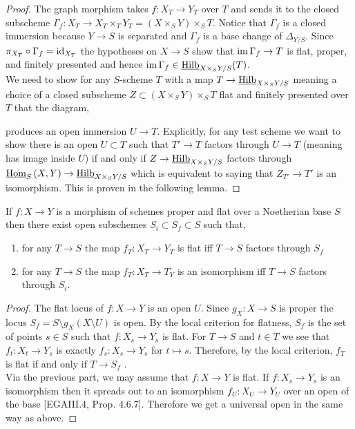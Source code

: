 \documentclass[12pt]{article}
\newcommand{\uHilb}{\underline{\Hilb}}
\newcommand{\uHom}[3]{\underline{\mathrm{Hom}}_{#1}\left(#2, #3\right)}
\begin{document}
\begin{proof}
The graph morphism takes $f : X_T \to Y_T$ over $T$ and sends it to the closed subscheme $\Gamma_f : X_T \to X_T \times_T Y_T = (X \times_S Y) \times_S T$. Notice that $\Gamma_f$ is a closed immersion because $Y \to S$ is separated and $\Gamma_f$ is a base change of $\Delta_{Y/S}$. Since $\pi_{X_T} \circ \Gamma_f = \mathrm{id}_{X_T}$ the hypotheses on $X \to S$ show that $\operatorname{\mathrm{im}}{\Gamma_f} \to T$ is flat, proper, and finitely presented and hence $\im{\Gamma_f} \in \uHilb_{X \times_S Y/S}(T)$.
\bigskip\\
We need to show for any $S$-scheme $T$ with a map $T \to \uHilb_{X \times_S Y /S}$ meaning a choice of a closed subscheme $Z \subset (X \times_S Y) \times_S T$ flat and finitely presented over $T$ that the diagram,
\begin{center}
\end{center}
produces an open immersion $U \to T$. Explicitly, for any test scheme  we want to show there is an open $U \subset T$ such that $T' \to T$ factors through $U \to T$ (meaning has image inside $U$) if and only if $Z \to \uHilb_{X \times_S Y/S}$ factors through $\uHom{S}{X}{Y} \to \uHilb_{X \times_S Y/S}$ which is equivalent to saying that $Z_{T'} \to T'$ is an isomorphism. This is proven in the following lemma.
\end{proof}

\begin{lemma}
If $f : X \to Y$ is a morphism of schemes proper and flat over a Noetherian base $S$ then there exist open subschemes $S_i \subset S_f \subset S$ such that,
\begin{enumerate}
\item for any $T \to S$ the map $f_T : X_T \to Y_T$ is flat iff $T \to S$ factors through $S_f$
\item for any $T \to S$ the map $f_T : X_T \to T_Y$ is an isomorphism iff $T \to S$ factors through $S_i$.
\end{enumerate}
\end{lemma}

\begin{proof}
The flat locus of $f : X \to Y$ is an open $U$. Since $g_X : X \to S$ is proper the locus $S_f = S \setminus g_X(X \setminus U)$ is open. By the local criterion for flatness, $S_f$ is the set of points $s \in S$ such that $f : X_s \to Y_s$ is flat. For $T \to S$ and $t \in T$ we see that $f_t : X_t \to Y_s$ is exactly $f_s : X_s \to Y_s$ for $t \mapsto s$. Therefore, by the local criterion, $f_T$ is flat if and only if $T \to S_f$ .
\bigskip\\
Via the previous part, we may assume that $f : X \to Y$ is flat. If $f : X_s \to Y_s$ is an isomorphism then it spreads out to an isomorphism $f_U : X_U \to Y_U$ over an open of the base [EGAIII.4, Prop. 4.6.7]. Therefore we get a universal open in the same way as above.
\end{proof}
\end{document}
